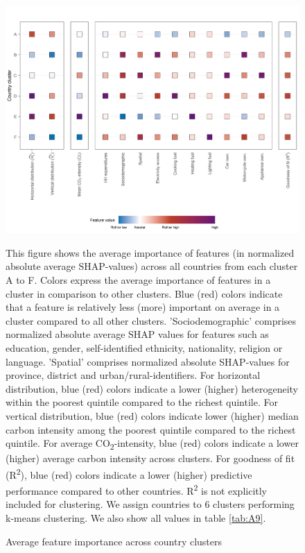 \documentclass[12pt, a4paper]{article}
\newenvironment{subcaption2}
{\strut
\vspace{-5pt}
\begin{minipage}[b]{0.9\textwidth}
  \hspace*{-\parindent}
  \footnotesize}
 {\end{minipage}}
\begin{document}
\begin{figure}[ht!]
    \centering
    \includegraphics{1_Figures/Figure 3/Figure_3_Corrected.jpg}
    \caption{Average feature importance across country clusters}
    \label{fig:fig_3}
    \begin{subcaption2}
    This figure shows the average importance of features (in normalized absolute average SHAP-values) across all countries from each cluster A to F. Colors express the average importance of features in a cluster in comparison to other clusters. Blue (red) colors indicate that a feature is relatively less (more) important on average in a cluster compared to all other clusters. 'Sociodemographic' comprises normalized absolute average SHAP values for features such as education, gender, self-identified ethnicity, nationality, religion or language. 'Spatial' comprises normalized absolute SHAP-values for province, district and urban/rural-identifiers. For horizontal distribution, blue (red) colors indicate a lower (higher) heterogeneity within the poorest quintile compared to the richest quintile. For vertical distribution, blue (red) colors indicate lower (higher) median carbon intensity among the poorest quintile compared to the richest quintile. For average CO\textsubscript{2}-intensity, blue (red) colors indicate a lower (higher) average carbon intensity across clusters. For goodness of fit (R\textsuperscript{2}), blue (red) colors indicate a lower (higher) predictive performance compared to other countries. R\textsuperscript{2} is not explicitly included for clustering. We assign countries to 6 clusters performing k-means clustering. We also show all values in table \ref{tab:A9}.
    \end{subcaption2}
\end{figure}
\end{document}
